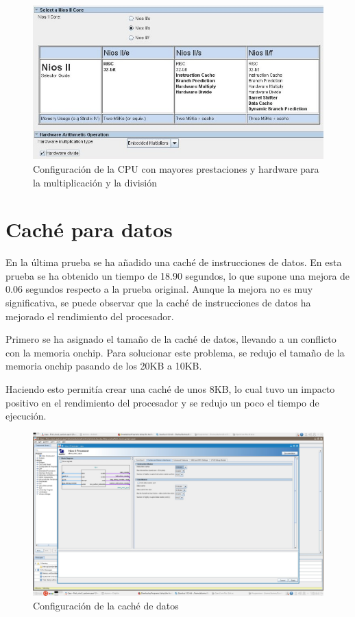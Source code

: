 \documentclass[11pt]{report}
\begin{document}
\begin{figure}[H]
  \centering
  \includegraphics[scale=0.8]{img/hardware_multiplicacion_division.jpeg}
  \caption{Configuración de la CPU con mayores prestaciones y hardware para la multiplicación y la división}
\end{figure}

\newpage

\section{Caché para datos}
En la última prueba se ha añadido una caché de instrucciones de datos. En esta prueba se ha obtenido un tiempo de 18.90 segundos, lo que supone
una mejora de 0.06 segundos respecto a la prueba original. Aunque la mejora no es muy significativa, se puede observar que la caché de instrucciones
de datos ha mejorado el rendimiento del procesador. 

Primero se ha asignado el tamaño de la caché de datos, llevando a un conflicto con la memoria onchip. Para solucionar este problema, se redujo
el tamaño de la memoria onchip pasando de los 20KB a 10KB.

Haciendo esto permitía crear una caché de unos 8KB, lo cual tuvo un impacto positivo en el rendimiento del procesador y se redujo un poco el tiempo
de ejecución.

\begin{figure}[H]
  \centering
  \includegraphics[scale=0.34]{img/cache_8KB.jpeg}
  \caption{Configuración de la caché de datos}
\end{figure}
\end{document}
